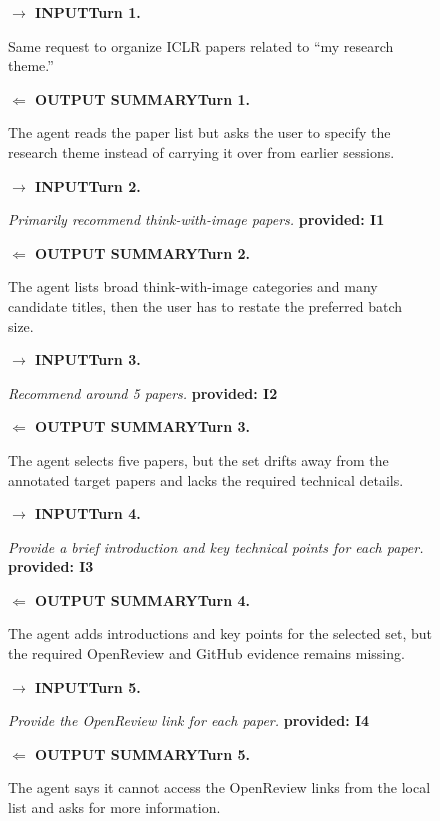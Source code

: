 \documentclass{llmxive}
\providecommand{\caseLeihaodiTwoTag}[3]{    {\setlength{\fboxsep}{1.6pt}\colorbox{#1}{\scriptsize\textbf{#3}}}}
\providecommand{\caseLeihaodiTwoLine}[3]{    \caseLeihaodiTwoTag{#1}{#2}{#3}\hspace{3pt}}
\providecommand{\caseLeihaodiTwoIO}[3]{    \vspace{2pt}
    \noindent\caseLeihaodiTwoLine{#1}{white}{#2}\textbf{#3}
}
\providecommand{\caseLeihaodiTwoBox}[2]{\begin{tcolorbox}[
    title=#1,
    colback=casebg,
    colframe=casetitlebg,
    rounded corners,
    sharp corners=northeast,
    sharp corners=southwest,
    width=1.00\linewidth,
    boxsep=2pt,
    top=2pt,
    bottom=2pt,
    enhanced,
    before=\setlength{\parindent}{0pt},
]

#2
\end{tcolorbox}
}
\begin{document}
\begin{figure}[!htbp]
    \centering
    \caseLeihaodiTwoBox{Case Study -- Researcher -- Kimi K2.5: Trajectory and Scores}{
    \small
    \caseLeihaodiTwoIO{blue!65!black}{$\rightarrow$ INPUT}{Turn 1.}
    Same request to organize ICLR papers related to ``my research theme.''

    \caseLeihaodiTwoIO{green!45!black}{$\Leftarrow$ OUTPUT SUMMARY}{Turn 1.}
    The agent reads the paper list but asks the user to specify the research theme instead of carrying it over from earlier sessions.

    \vspace{2pt}
    \caseLeihaodiTwoIO{blue!65!black}{$\rightarrow$ INPUT}{Turn 2.}
    \emph{Primarily recommend think-with-image papers.}
    \caseLeihaodiTwoTag{red!15}{red!70!black}{provided: I1}

    \caseLeihaodiTwoIO{green!45!black}{$\Leftarrow$ OUTPUT SUMMARY}{Turn 2.}
    The agent lists broad think-with-image categories and many candidate titles, then the user has to restate the preferred batch size.

    \vspace{2pt}
    \caseLeihaodiTwoIO{blue!65!black}{$\rightarrow$ INPUT}{Turn 3.}
    \emph{Recommend around 5 papers.}
    \caseLeihaodiTwoTag{red!15}{red!70!black}{provided: I2}

    \caseLeihaodiTwoIO{green!45!black}{$\Leftarrow$ OUTPUT SUMMARY}{Turn 3.}
    The agent selects five papers, but the set drifts away from the annotated target papers and lacks the required technical details.

    \vspace{2pt}
    \caseLeihaodiTwoIO{blue!65!black}{$\rightarrow$ INPUT}{Turn 4.}
    \emph{Provide a brief introduction and key technical points for each paper.}
    \caseLeihaodiTwoTag{red!15}{red!70!black}{provided: I3}

    \caseLeihaodiTwoIO{green!45!black}{$\Leftarrow$ OUTPUT SUMMARY}{Turn 4.}
    The agent adds introductions and key points for the selected set, but the required OpenReview and GitHub evidence remains missing.

    \vspace{2pt}
    \caseLeihaodiTwoIO{blue!65!black}{$\rightarrow$ INPUT}{Turn 5.}
    \emph{Provide the OpenReview link for each paper.}
    \caseLeihaodiTwoTag{red!15}{red!70!black}{provided: I4}

    \caseLeihaodiTwoIO{green!45!black}{$\Leftarrow$ OUTPUT SUMMARY}{Turn 5.}
    The agent says it cannot access the OpenReview links from the local list and asks for more information.

}
\end{figure}
\end{document}

